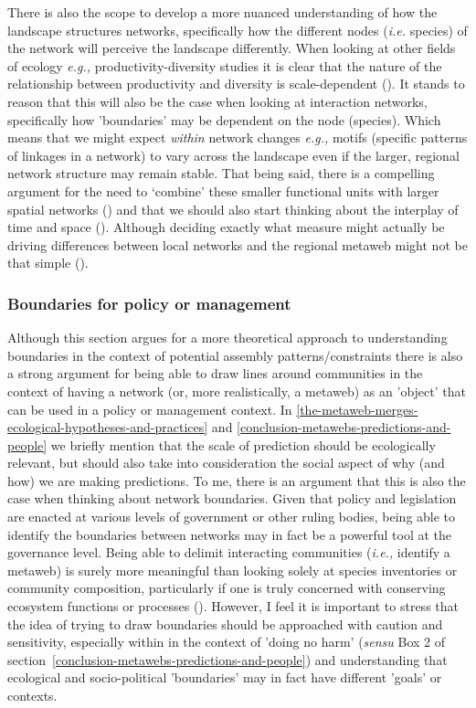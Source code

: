 \begin{refsection}
There is also the scope to develop a more nuanced understanding of how
the landscape structures networks, specifically how the different nodes
(\emph{i.e.} species) of the network will perceive the landscape
differently. When looking at other fields of ecology \emph{e.g.,} productivity-diversity studies it is clear that the nature of the relationship between productivity and diversity is scale-dependent (\cite{Chase2002SpaSca, Gillman2006InfPro}). It stands to reason that this will also be the case when looking at interaction networks, specifically how 'boundaries' may be dependent on the node (species). Which means that we might expect \emph{within} network changes \emph{e.g.,} motifs (specific patterns of linkages in a network) to vary across the landscape even if the larger, regional network structure may remain stable. That being said, there is a compelling argument for the need to `combine' these smaller functional units with larger spatial networks (\cite{Fortin2021Network}) and that we should also start thinking about the interplay of time and space (\cite{Estay2023Editorial}). Although deciding exactly what measure might actually be driving differences between local networks and the regional metaweb might not be that simple (\cite{Saravia2022Ecological}).

\subsubsection{Boundaries for policy or management}

Although this section argues for a more theoretical approach to understanding boundaries in the context of potential assembly patterns/constraints there is also a strong argument for being able to draw lines around communities in the context of having a network (or, more realistically, a metaweb) as an 'object' that can be used in a policy or management context. In \autoref{the-metaweb-merges-ecological-hypotheses-and-practices} and \autoref{conclusion-metawebs-predictions-and-people} we briefly mention that the scale of prediction should be ecologically relevant, but should also take into consideration the social aspect of why (and how) we are making predictions. To me, there is an argument that this is also the case when thinking about network boundaries. Given that policy and legislation are enacted at various levels of government or other ruling bodies, being able to identify the boundaries between networks may in fact be a powerful tool at the governance level. Being able to delimit interacting communities (\emph{i.e.,} identify a metaweb) is surely more meaningful than looking solely at species inventories or community composition, particularly if one is truly concerned with conserving ecosystem functions or processes (\cite{Wood2022Missing, ThuillerNavigating}). However, I feel it is important to stress that the idea of trying to draw boundaries should be approached with caution and sensitivity, especially within in the context of 'doing no harm' (\emph{sensu} Box 2 of section~\ref{conclusion-metawebs-predictions-and-people}) and understanding that ecological and socio-political 'boundaries' may in fact have different 'goals' or contexts.


\end{refsection}
